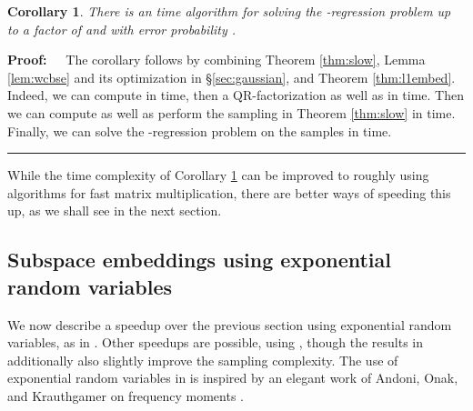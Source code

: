 \documentclass[11pt]{article}
\newtheorem{corollary}[theorem]{Corollary}
\newenvironment{proof}{\begin{trivlist} \item {\bf Proof:~~}}
  {\qed\end{trivlist}}
\def\qed{\hfill\rule{2mm}{2mm}}
\begin{document}
\begin{corollary}\label{cor:first}
There is an  time algorithm for solving the -regression problem
up to a factor of  and with error probability . 
\end{corollary}
\begin{proof}
The corollary follows by combining Theorem \ref{thm:slow}, Lemma \ref{lem:wcbse} and its optimization in
\S\ref{sec:gaussian}, and 
Theorem \ref{thm:l1embed}. Indeed, we can compute  in  time, then a QR-factorization as
well as  in  time. Then we can compute  as well as perform
the sampling in Theorem \ref{thm:slow} in  time. Finally, we can solve the -regression
problem on the samples in  time. 
\end{proof}
While the time complexity of Corollary \ref{cor:first} can be improved to roughly
 using algorithms for fast matrix multiplication, there are better
ways of speeding this up, as we shall see in the next section. 

\subsection{Subspace embeddings using exponential random variables}\label{sec:exponential}
We now describe a speedup over the previous section using exponential random variables, as in \cite{wz13}. Other
speedups are possible, using \cite{CDMMMW13,CW13,MM13}, though the results in \cite{wz13} additionally also 
slightly improve the sampling complexity. The use of exponential random variables in \cite{wz13} is inspired
by an elegant work of Andoni, Onak, and Krauthgamer on frequency moments \cite{AKO11,Andoni12}. 
\end{document}
